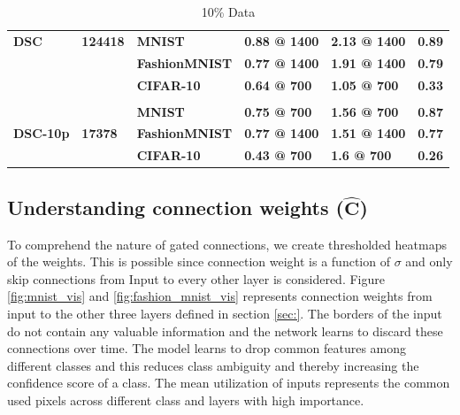 \documentclass{article}
\let\oldhat\hat
\renewcommand{\hat}[1]{\oldhat{\mathbf{#1}}}
\begin{document}
\begin{table}[H]
\begin{tabular}{llllll}
\textbf{DSC}                      & \textbf{124418}                     & \textbf{MNIST}                    & \textbf{0.88 @ 1400}      & \textbf{2.13 @ 1400}  & \textbf{0.89}                     \\
\textbf{}                         & \textbf{}                           & \textbf{FashionMNIST}             & \textbf{0.77 @ 1400}      & \textbf{1.91 @ 1400}  & \textbf{0.79}                     \\
\textbf{}                         & \textbf{}                           & \textbf{CIFAR-10}                 & \textbf{0.64 @ 700}       & \textbf{1.05 @ 700}   & \textbf{0.33}                     \\
                                  &                                     &                                   &                           &                       &                                   \\
\multirow{3}{*}{\textbf{DSC-10p}} & \multirow{3}{*}{\textbf{17378}}     & \textbf{MNIST}                    & \textbf{0.75 @ 700}       & \textbf{1.56 @ 700}   & \textbf{0.87}                     \\
                                  &                                     & \textbf{FashionMNIST}             & \textbf{0.77 @ 1400}      & \textbf{1.51 @ 1400}  & \textbf{0.77}                     \\
                                  &                                     & \textbf{CIFAR-10}                 & \textbf{0.43 @ 700}       & \textbf{1.6 @ 700}    & \textbf{0.26}                     \\ \cline{3-6} 
\end{tabular}
\caption{10\% Data}
\label{tab:my-table}
\end{table}


\subsection{Understanding connection weights ($\hat{C}$)}
To comprehend the nature of gated connections, we create thresholded heatmaps of the weights. This is possible since connection weight is a function of $\sigma$ and only skip connections from Input to every other layer is considered. Figure \ref{fig:mnist_vis} and \ref{fig:fashion_mnist_vis} represents connection weights from input to the other three layers defined in section \ref{sec:}. The borders of the input do not contain any valuable information and the network learns to discard these connections over time. The model learns to drop common features among different classes and this reduces class ambiguity and thereby increasing the confidence score of a class. The mean utilization of inputs represents the common used pixels across different class and layers with high importance.
\end{document}
